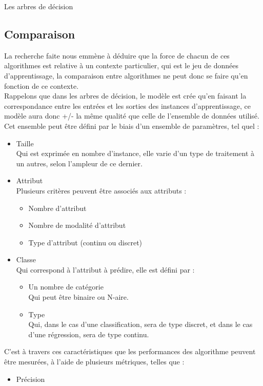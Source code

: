 \documentclass[a4paper, 11pt]{report}
\begin{document}
\begin{chapter}{Les arbres de décision}
\subsection{Comparaison}
La recherche faite nous emmène à déduire que la force de chacun de ces algorithmes est relative à un contexte particulier, qui est le jeu de données d'apprentissage, la comparaison entre algorithmes ne peut donc se faire qu'en fonction de ce contexte.\\
Rappelons que dans les arbres de décision, le modèle est crée qu'en faisant la correspondance entre les entrées et les sorties des instances d'apprentissage, ce modèle aura donc +/- la même qualité que celle de l'ensemble de données utilisé. Cet ensemble peut être défini par le biais d'un ensemble de paramètres, tel quel : 
\begin{itemize}
\item Taille\\
Qui est exprimée en nombre d'instance, elle varie d'un type de traitement à un autres, selon l'ampleur de ce dernier.
\item Attribut \\
Plusieurs critères peuvent être associés aux attributs : 
\begin{itemize}
\item Nombre d'attribut
\item Nombre de modalité d'attribut
\item Type d'attribut (continu ou discret)
\end{itemize}
\item Classe\\
Qui correspond à l'attribut à prédire, elle est défini par : 
\begin{itemize}
\item Un nombre de catégorie\\
Qui peut être binaire ou N-aire.
\item Type\\
Qui, dans le cas d'une classification, sera de type discret, et dans le cas d'une régression, sera de type continu.
\end{itemize}
\end{itemize}
C'est à travers ces caractéristiques que les performances des algorithme peuvent être mesurées, à l'aide de plusieurs métriques, telles que : \\
\begin{itemize}
\item Précision\\

\end{itemize}
\end{chapter}
\end{document}
